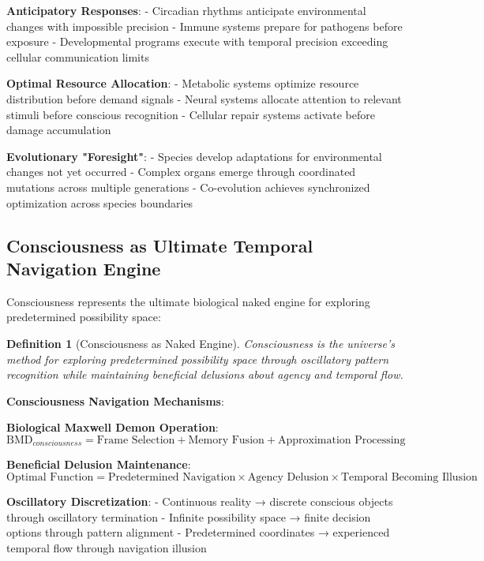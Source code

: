 \documentclass[12pt,a4paper]{article}
\newtheorem{definition}[theorem]{Definition}
\begin{document}
\textbf{Anticipatory Responses}:
- Circadian rhythms anticipate environmental changes with impossible precision
- Immune systems prepare for pathogens before exposure
- Developmental programs execute with temporal precision exceeding cellular communication limits

\textbf{Optimal Resource Allocation}:
- Metabolic systems optimize resource distribution before demand signals
- Neural systems allocate attention to relevant stimuli before conscious recognition
- Cellular repair systems activate before damage accumulation

\textbf{Evolutionary "Foresight"}:
- Species develop adaptations for environmental changes not yet occurred
- Complex organs emerge through coordinated mutations across multiple generations
- Co-evolution achieves synchronized optimization across species boundaries

\subsection{Consciousness as Ultimate Temporal Navigation Engine}

Consciousness represents the ultimate biological naked engine for exploring predetermined possibility space:

\begin{definition}[Consciousness as Naked Engine]
Consciousness is the universe's method for exploring predetermined possibility space through oscillatory pattern recognition while maintaining beneficial delusions about agency and temporal flow.
\end{definition}

\textbf{Consciousness Navigation Mechanisms}:

\textbf{Biological Maxwell Demon Operation}:
\begin{equation}
\text{BMD}_{consciousness} = \text{Frame Selection} + \text{Memory Fusion} + \text{Approximation Processing}
\end{equation}

\textbf{Beneficial Delusion Maintenance}:
\begin{equation}
\text{Optimal Function} = \text{Predetermined Navigation} \times \text{Agency Delusion} \times \text{Temporal Becoming Illusion}
\end{equation}

\textbf{Oscillatory Discretization}:
- Continuous reality → discrete conscious objects through oscillatory termination
- Infinite possibility space → finite decision options through pattern alignment
- Predetermined coordinates → experienced temporal flow through navigation illusion
\end{document}
